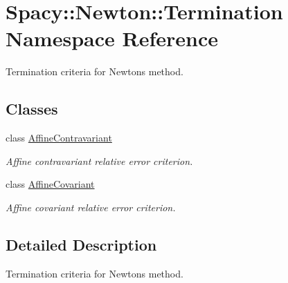 \hypertarget{namespaceSpacy_1_1Newton_1_1Termination}{}\section{Spacy\+:\+:Newton\+:\+:Termination Namespace Reference}
\label{namespaceSpacy_1_1Newton_1_1Termination}


Termination criteria for Newton\textquotesingle{}s method.  


\subsection*{Classes}
\begin{DoxyCompactItemize}
\item 
class \hyperlink{classSpacy_1_1Newton_1_1Termination_1_1AffineContravariant}{Affine\+Contravariant}
\begin{DoxyCompactList}\small\item\em Affine contravariant relative error criterion. \end{DoxyCompactList}\item 
class \hyperlink{classSpacy_1_1Newton_1_1Termination_1_1AffineCovariant}{Affine\+Covariant}
\begin{DoxyCompactList}\small\item\em Affine covariant relative error criterion. \end{DoxyCompactList}\end{DoxyCompactItemize}


\subsection{Detailed Description}
Termination criteria for Newton\textquotesingle{}s method. 